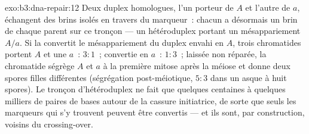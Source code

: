 \begin{solution}{exo:b3:dna-repair:12}
Deux duplex homologues, l'un porteur de $A$ et l'autre de $a$,
échangent des brins isolés en travers du marqueur~: chacun a désormais
un brin de chaque parent sur ce tronçon --- un hétéroduplex portant un
mésappariement $A/a$. Si la  convertit le
mésappariement du duplex envahi en $A$, trois chromatides portent $A$
et une $a$~: $3{:}1$~; convertie en $a$~: $1{:}3$~; laissée non
réparée, la chromatide ségrège $A$ et $a$ à la première mitose après la
méiose et donne deux spores filles différentes (ségrégation
post-méiotique, $5{:}3$ dans un asque à huit spores). Le tronçon
d'hétéroduplex ne fait que quelques centaines à quelques milliers de
paires de bases autour de la cassure initiatrice, de sorte que seuls
les marqueurs qui s'y trouvent peuvent être convertis --- et ils sont,
par construction, voisins du crossing-over.
\end{solution}

